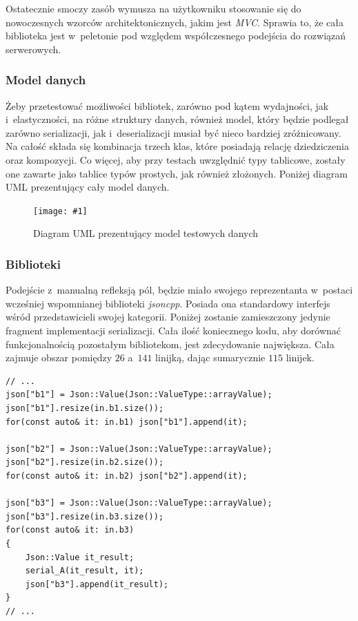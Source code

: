 \documentclass[12pt]{article}
\newcommand{\n}{\newline}
\newcommand{\putfig}[3]{
	\begin{figure}[H]
	\centering
	\texttt{[image: \#1]}
	\caption{#2}
	\label{#3}
	\medskip
\end{figure}
}
\newcommand{\nonpl}[1]{{\it #1}}
\begin{document}
{{{				Ostatecznie smoczy zasób wymusza na użytkowniku stosowanie się do nowoczesnych wzorców architektonicznych, jakim jest \nonpl{MVC}\cite{mvc}.
				Sprawia to, że cała biblioteka jest w~peletonie pod względem współczesnego podejścia do rozwiązań serwerowych.
			}

			{
				\subsubsection{Model danych}

				Żeby przetestować możliwości bibliotek, zarówno pod kątem wydajności, jak i~elastyczności, na różne struktury danych,
				również model, który będzie podlegał zarówno serializacji, jak i~deserializacji musiał być nieco bardziej zróżnicowany.
				Na całość składa się kombinacja trzech klas, które posiadają relację dziedziczenia oraz kompozycji. Co więcej, aby przy
				testach uwzględnić typy tablicowe, zostały one zawarte jako tablice typów prostych, jak również złożonych. Poniżej
				diagram UML prezentujący cały model danych.

				\putfig{./img/benchmark_model_uml_diagram.png}{Diagram UML prezentujący model testowych danych}{uml_diagram}
			}

			{
				\subsubsection{Biblioteki}

				Podejście z~manualną refleksją pól, będzie miało swojego reprezentanta w~postaci wcześniej wspomnianej biblioteki \nonpl{jsoncpp}.
				Posiada ona standardowy interfejs wśród przedstawicieli swojej kategorii. Poniżej zostanie zamieszczony jedynie fragment
				implementacji serializacji. Cała ilość koniecznego kodu, aby dorównać funkcjonalnością pozostałym bibliotekom, jest zdecydowanie
				największa. Cała zajmuje obszar pomiędzy $26$ a~$141$ linijką, dając sumarycznie $115$ linijek.\n

				\begin{lstlisting}[frame=single]
// ...
json["b1"] = Json::Value(Json::ValueType::arrayValue);
json["b1"].resize(in.b1.size());
for(const auto& it: in.b1) json["b1"].append(it);

json["b2"] = Json::Value(Json::ValueType::arrayValue);
json["b2"].resize(in.b2.size());
for(const auto& it: in.b2) json["b2"].append(it);

json["b3"] = Json::Value(Json::ValueType::arrayValue);
json["b3"].resize(in.b3.size());
for(const auto& it: in.b3)
{
	Json::Value it_result;
	serial_A(it_result, it);
	json["b3"].append(it_result);
}
// ...
				\end{lstlisting}

}}}
\end{document}
